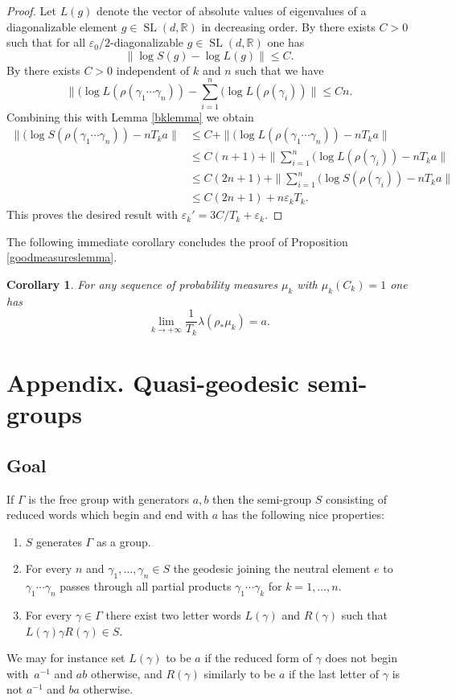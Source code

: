 \documentclass[10pt,a4paper]{amsart}
\let\ts\textstyle
\let\epsilon\varepsilon
\newtheorem{corollary}[theorem]{Corollary}
\newcommand{\R}{\mathbb{R}}
\let\e\varepsilon
\DeclareMathOperator{\SL}{SL}
\begin{document}
\begin{proof}
Let \(L(g)\) denote the vector of absolute values of eigenvalues of a diagonalizable element \(g \in \SL(d,\R)\) in decreasing order.
By \cite[Lem.\,2.16]{2021breuillard-sert} there exists \(C > 0\) such that for all \(\e_0/2\)-diagonalizable \(g \in \SL(d,\R)\) one has
\[
\|\log S(g) - \log L(g)\| \le C.
\]
By \cite[Prop.\,2.17]{2021breuillard-sert} there exists \(C > 0\) independent of \(k\) and \(n\) such that we have
\[
\|\ts (\log L(\rho(\gamma_1\cdots \gamma_n)) - \sum_{i = 1}^n (\log L (\rho(\gamma_i))\| \le Cn.
\]
Combining this with Lemma \ref{bklemma} we obtain
\begin{align*}\|(\log S(\rho(\gamma_1 \cdots \gamma_n)) - n T_k a\| &\le C + \|(\log L (\rho(\gamma_1\cdots \gamma_n))- nT_k a\|
\\ &\ts\le C(n+1) + \|\sum_{i = 1}^n(\log L (\rho(\gamma_i)) - nT_k a\|
\\ &\ts\le C(2n+1) + \|\sum_{i = 1}^n(\log S (\rho(\gamma_i))- nT_k a\|
\\ &\le C(2n+1) + n \epsilon_k T_k.
\end{align*}
This proves the desired result with \(\epsilon_k' = 3C / T_k + \epsilon_k\).
\end{proof}

The following immediate corollary concludes the proof of Proposition \ref{goodmeasureslemma}.

\begin{corollary}
For any sequence of probability measures \(\mu_k\) with \(\mu_k(C_k) = 1\) one has
\[
\lim_{k \to +\infty}\frac{1}{T_k}\lambda(\rho_*\mu_k) = a.
\]
\end{corollary}

\appendix
\section*{Appendix. Quasi-geodesic semi-groups}
\subsection{Goal}

If \(\Gamma\) is the free group with generators \(a,b\) then the semi-group \(S\) consisting of reduced words which begin and end with \(a\) has the following nice properties:
\begin{enumerate}
\item \(S\) generates \(\Gamma\) as a group.
\item For every \(n\) and \(\gamma_1,\ldots, \gamma_n \in S\) the geodesic joining the neutral element \(e\) to \(\gamma_1\cdots \gamma_n\) passes through all partial products \(\gamma_1\cdots \gamma_k\) for \(k = 1,\ldots, n\).
\item For every \(\gamma \in \Gamma\) there exist two letter words \(L(\gamma)\) and \(R(\gamma)\) such that \(L(\gamma)\gamma R(\gamma) \in S\).
\end{enumerate}
We may for instance set \(L(\gamma)\) to be \(a\) if the reduced form of \(\gamma\) does not begin with~\(a^{-1}\) and \(ab\) otherwise, and \(R(\gamma)\) similarly to be \(a\) if the last letter of \(\gamma\) is not \(a^{-1}\) and \(ba\) otherwise.
\end{document}
